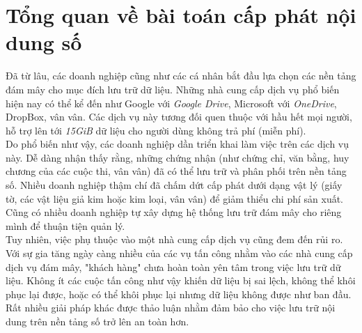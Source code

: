 \chapter{Tổng quan về bài toán cấp phát nội dung số}

Đã từ lâu, các doanh nghiệp cũng như các cá nhân bắt đầu lựa chọn các nền tảng đám mây cho mục đích lưu trữ dữ liệu. Những nhà cung cấp dịch vụ phổ biến hiện nay có thể kể đến như Google với \textit{Google Drive}, Microsoft với \textit{OneDrive}, DropBox, vân vân. Các dịch vụ này tương đối quen thuộc với hầu hết mọi người, hỗ trợ lên tới \textit{15GiB} dữ liệu cho người dùng không trả phí (miễn phí).\\

Do phổ biến như vậy, các doanh nghiệp dần triển khai làm việc trên các dịch vụ này. Dễ dàng nhận thấy rằng, những chứng nhận (như chứng chỉ, văn bằng, huy chương của các cuộc thi, vân vân) đã có thể lưu trữ và phân phối trên nền tảng số. Nhiều doanh nghiệp thậm chí đã chấm dứt cấp phát dưới dạng vật lý (giấy tờ, các vật liệu giả kim hoặc kim loại, vân vân) để giảm thiểu chi phí sản xuất. Cũng có nhiều doanh nghiệp tự xây dựng hệ thống lưu trữ đám mây cho riêng mình để thuận tiện quản lý.\\

Tuy nhiên, việc phụ thuộc vào một nhà cung cấp dịch vụ cũng đem đến rủi ro. Với sự gia tăng ngày càng nhiều của các vụ tấn công nhằm vào các nhà cung cấp dịch vụ đám mây, "khách hàng" chưa hoàn toàn yên tâm trong việc lưu trữ dữ liệu. Không ít các cuộc tấn công như vậy khiến dữ liệu bị sai lệch, không thể khôi phục lại được, hoặc có thể khôi phục lại nhưng dữ liệu không được như ban đầu. Rất nhiều giải pháp khác được thảo luận nhằm đảm bảo cho việc lưu trữ nội dung trên nền tảng số trở lên an toàn hơn.\\